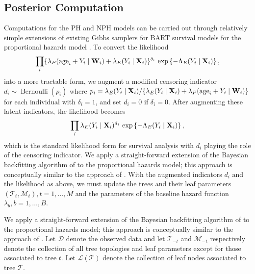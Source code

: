 \documentclass[12pt]{article}
\newcommand{\Bernoulli}{\operatorname{Bernoulli}}
\newcommand{\Data}{\mathcal D}
\newcommand{\Leaves}{\mathcal L}
\newcommand{\sM}{\mathcal M}
\newcommand{\Tree}{\mathcal T}
\newcommand{\bfW}{{\bf W}}
\newcommand{\bfX}{{\bf X}}
\begin{document}
\subsection{Posterior Computation}
Computations for the PH and NPH models can be carried out through relatively
simple extensions of existing Gibbs samplers for BART survival models for the
proportional hazards model \citet{basak2021algorithm}. To convert the likelihood
$$
  \prod_i \{\lambda_P(\text{age}_i + Y_i \mid \bfW_i) + \lambda_E(Y_i \mid \bfX_i)\}^{\delta_i}
  \, \exp\left\{-\Lambda_E(Y_i \mid \bfX_i)\right\},
$$
into a more tractable form, we augment a modified censoring indicator $d_i \sim
\Bernoulli(p_i)$ where $p_i = \lambda_E(Y_i \mid \bfX_i) / \{\lambda_E(Y_i \mid
\bfX_i) + \lambda_P(\text{age}_i + Y_i \mid \bfW_i)\}$ for each individual with $\delta_i = 1$, and
set $d_i = 0$ if $\delta_i = 0$. After augmenting these latent indicators, the
likelihood becomes
\begin{equation}
\label{eq:lambda_likelihood}
  \prod_i \lambda_E(Y_i \mid \bfX_i)^{d_i}
  \, \exp\left\{-\Lambda_E(Y_i \mid \bfX_i)\right\},
\end{equation}
which is the standard likelihood form for survival analysis with $d_i$ playing
the role of the censoring indicator. We apply a straight-forward extension of the Bayesian backfitting algorithm of 
\citet{chipman2010bart} to the proportional hazards model; this approach is 
conceptually similar to the approach of \citet{linero2021bayesian}. With the augmented indicators $d_i$ and the likelihood as above, we must update the trees and their leaf parameters $(\Tree_t, \sM_t), t=1, \dots, M$ and the parameters of the baseline hazard function $\lambda_b, b=1, \dots, B.$


We apply a straight-forward extension of the Bayesian backfitting algorithm of 
\citet{chipman2010bart} to the proportional hazards model; this approach is 
conceptually similar to the approach of \citet{linero2021bayesian}. Let $\Data$ denote the observed data and let $\Tree_{-t}$ and $\sM_{-t}$  respectively denote the collection of all tree topologies and leaf parameters except for those associated to tree $t$. Let $\Leaves(\Tree)$ denote the collection of leaf nodes associated to tree $\Tree$.
\end{document}
